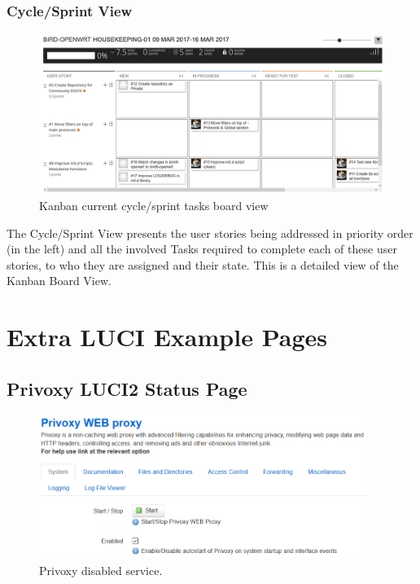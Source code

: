 \begin{appendices}
\begin{landscape}
\subsection{Cycle/Sprint View}
\begin{figure}[ht!]
\centering
    \includegraphics[width=0.85\hsize]{images/kanban/cycle}
    \caption{Kanban current cycle/sprint tasks board view}
    \label{fig:kcycle}
\end{figure}
The Cycle/Sprint View presents the user stories being addressed in priority order (in the left) and all the involved Tasks required to complete each of these user stories, to who they are assigned and their state. This is a detailed view of the Kanban Board View.

\end{landscape}

\chapter{Extra LUCI Example Pages}
\label{app:ch:extrap}

\section{Privoxy LUCI2 Status Page}
\begin{figure}[H]
    \centering
    \includegraphics[width=0.95\textwidth]{images/luciextra/disabled}
    \caption{Privoxy disabled service.}
    \label{fig:privdis}
\end{figure}


\end{appendices}
